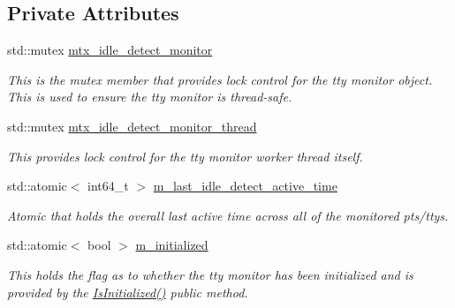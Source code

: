 \subsection*{Private Attributes}
\begin{DoxyCompactItemize}
\item 
\mbox{\label{classEventDetect_1_1IdleDetectMonitor_a5a701c9f31c680cda110cdaa8a527da1}} 
std\+::mutex \mbox{\hyperlink{classEventDetect_1_1IdleDetectMonitor_a5a701c9f31c680cda110cdaa8a527da1}{mtx\+\_\+idle\+\_\+detect\+\_\+monitor}}
\begin{DoxyCompactList}\small\item\em This is the mutex member that provides lock control for the tty monitor object. This is used to ensure the tty monitor is thread-\/safe. \end{DoxyCompactList}\item 
\mbox{\label{classEventDetect_1_1IdleDetectMonitor_abf3c0cc87481f3f68db72ecae4c2a609}} 
std\+::mutex \mbox{\hyperlink{classEventDetect_1_1IdleDetectMonitor_abf3c0cc87481f3f68db72ecae4c2a609}{mtx\+\_\+idle\+\_\+detect\+\_\+monitor\+\_\+thread}}
\begin{DoxyCompactList}\small\item\em This provides lock control for the tty monitor worker thread itself. \end{DoxyCompactList}\item 
\mbox{\label{classEventDetect_1_1IdleDetectMonitor_acc9798f26d29719e8dffae5ed358fa43}} 
std\+::atomic$<$ int64\+\_\+t $>$ \mbox{\hyperlink{classEventDetect_1_1IdleDetectMonitor_acc9798f26d29719e8dffae5ed358fa43}{m\+\_\+last\+\_\+idle\+\_\+detect\+\_\+active\+\_\+time}}
\begin{DoxyCompactList}\small\item\em Atomic that holds the overall last active time across all of the monitored pts/ttys. \end{DoxyCompactList}\item 
\mbox{\label{classEventDetect_1_1IdleDetectMonitor_a9247d67e3ace050925e119bfbb45dcc5}} 
std\+::atomic$<$ bool $>$ \mbox{\hyperlink{classEventDetect_1_1IdleDetectMonitor_a9247d67e3ace050925e119bfbb45dcc5}{m\+\_\+initialized}}
\begin{DoxyCompactList}\small\item\em This holds the flag as to whether the tty monitor has been initialized and is provided by the \mbox{\hyperlink{classEventDetect_1_1IdleDetectMonitor_af945f0f33b8c0fe2c8ee33bd9ac83f12}{Is\+Initialized()}} public method. \end{DoxyCompactList}\end{DoxyCompactItemize}



